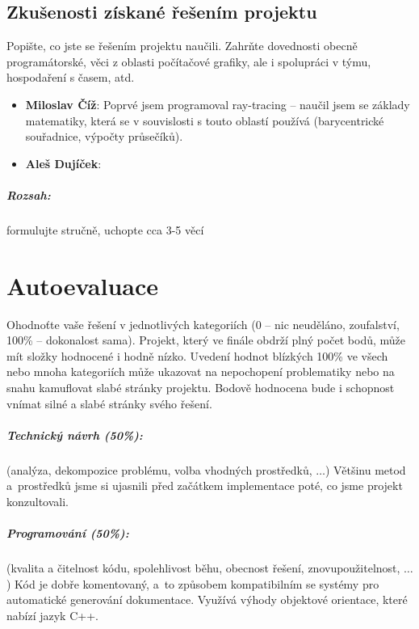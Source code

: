 \documentclass[12pt,a4paper,titlepage,final]{report}
\newcommand\AuthorA{Miloslav Číž}
\newcommand\AuthorB{Aleš Dujíček}
\begin{document}
\section{Zkušenosti získané řešením projektu}

Popište, co jste se řešením projektu naučili. Zahrňte dovednosti obecně
programátorské, věci z oblasti počítačové grafiky, ale i spolupráci v týmu,
hospodaření s časem, atd.

\begin{itemize}
\item \textbf{\AuthorA}: Poprvé jsem programoval ray-tracing -- naučil
jsem se základy matematiky, která se v souvislosti s touto oblastí
používá (barycentrické souřadnice, výpočty průsečíků).
\item \textbf{\AuthorB}:
\end{itemize}


\paragraph{Rozsah:} formulujte stručně, uchopte cca 3-5 věcí

\chapter{Autoevaluace}

Ohodnoťte vaše řešení v jednotlivých kategoriích (0 – nic neuděláno,
zoufalství, 100\% – dokonalost sama). Projekt, který ve finále obdrží plný
počet bodů, může mít složky hodnocené i hodně nízko. Uvedení hodnot blízkých
100\% ve všech nebo mnoha kategoriích může ukazovat na nepochopení problematiky nebo na snahu kamuflovat slabé stránky projektu. Bodově hodnocena bude i
schopnost vnímat silné a slabé stránky svého řešení.

\paragraph{Technický návrh (50\%):} (analýza, dekompozice problému, volba
vhodných prostředků, $\ldots$)
Většinu metod a~prostředků jsme si ujasnili před začátkem implementace
poté, co jsme projekt konzultovali.

\paragraph{Programování (50\%):} (kvalita a čitelnost kódu, spolehlivost běhu,
obecnost řešení, znovupoužitelnost, $\ldots$)
Kód je dobře komentovaný, a~to způsobem kompatibilním se systémy pro
automatické generování dokumentace. Využívá výhody objektové orientace,
které nabízí jazyk C++.
\end{document}
